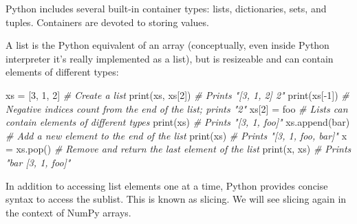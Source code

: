 \documentclass[
]{article}
\newenvironment{Shaded}{}{}
\newcommand{\BuiltInTok}[1]{#1}
\newcommand{\CommentTok}[1]{\textcolor[rgb]{0.38,0.63,0.69}{\textit{#1}}}
\newcommand{\DecValTok}[1]{\textcolor[rgb]{0.25,0.63,0.44}{#1}}
\newcommand{\NormalTok}[1]{#1}
\newcommand{\OperatorTok}[1]{\textcolor[rgb]{0.40,0.40,0.40}{#1}}
\newcommand{\StringTok}[1]{\textcolor[rgb]{0.25,0.44,0.63}{#1}}
\begin{document}
Python includes several built-in container types: lists, dictionaries,
sets, and tuples. Containers are devoted to storing values.

A list is the Python equivalent of an array (conceptually, even inside
Python interpreter it's really implemented as a list), but is resizeable
and can contain elements of different types:

\begin{Shaded}
\begin{Highlighting}[]
\NormalTok{xs }\OperatorTok{=}\NormalTok{ [}\DecValTok{3}\NormalTok{, }\DecValTok{1}\NormalTok{, }\DecValTok{2}\NormalTok{]    }\CommentTok{\# Create a list}
\BuiltInTok{print}\NormalTok{(xs, xs[}\DecValTok{2}\NormalTok{])  }\CommentTok{\# Prints "[3, 1, 2] 2"}
\BuiltInTok{print}\NormalTok{(xs[}\OperatorTok{{-}}\DecValTok{1}\NormalTok{])     }\CommentTok{\# Negative indices count from the end of the list; prints "2"}
\NormalTok{xs[}\DecValTok{2}\NormalTok{] }\OperatorTok{=} \StringTok{\textquotesingle{}foo\textquotesingle{}}     \CommentTok{\# Lists can contain elements of different types}
\BuiltInTok{print}\NormalTok{(xs)         }\CommentTok{\# Prints "[3, 1, \textquotesingle{}foo\textquotesingle{}]"}
\NormalTok{xs.append(}\StringTok{\textquotesingle{}bar\textquotesingle{}}\NormalTok{)  }\CommentTok{\# Add a new element to the end of the list}
\BuiltInTok{print}\NormalTok{(xs)         }\CommentTok{\# Prints "[3, 1, \textquotesingle{}foo\textquotesingle{}, \textquotesingle{}bar\textquotesingle{}]"}
\NormalTok{x }\OperatorTok{=}\NormalTok{ xs.pop()      }\CommentTok{\# Remove and return the last element of the list}
\BuiltInTok{print}\NormalTok{(x, xs)      }\CommentTok{\# Prints "bar [3, 1, \textquotesingle{}foo\textquotesingle{}]"}
\end{Highlighting}
\end{Shaded}

In addition to accessing list elements one at a time, Python provides
concise syntax to access the sublist. This is known as slicing. We will
see slicing again in the context of NumPy arrays.
\end{document}
